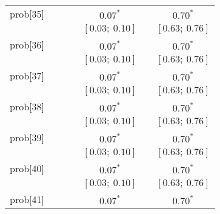 \begin{table}
\begin{center}
\begin{tabular}{l c c c c c c }
prob[35]  &                           &                           &                           & $0.07^{*}$              &                           & $0.70^{*}$            \\
          &                           &                           &                           & $[0.03;\ 0.10]$         &                           & $[0.63;\ 0.76]$       \\
prob[36]  &                           &                           &                           & $0.07^{*}$              &                           & $0.70^{*}$            \\
          &                           &                           &                           & $[0.03;\ 0.10]$         &                           & $[0.63;\ 0.76]$       \\
prob[37]  &                           &                           &                           & $0.07^{*}$              &                           & $0.70^{*}$            \\
          &                           &                           &                           & $[0.03;\ 0.10]$         &                           & $[0.63;\ 0.76]$       \\
prob[38]  &                           &                           &                           & $0.07^{*}$              &                           & $0.70^{*}$            \\
          &                           &                           &                           & $[0.03;\ 0.10]$         &                           & $[0.63;\ 0.76]$       \\
prob[39]  &                           &                           &                           & $0.07^{*}$              &                           & $0.70^{*}$            \\
          &                           &                           &                           & $[0.03;\ 0.10]$         &                           & $[0.63;\ 0.76]$       \\
prob[40]  &                           &                           &                           & $0.07^{*}$              &                           & $0.70^{*}$            \\
          &                           &                           &                           & $[0.03;\ 0.10]$         &                           & $[0.63;\ 0.76]$       \\
prob[41]  &                           &                           &                           & $0.07^{*}$              &                           & $0.70^{*}$            \\

\end{tabular}
\end{center}
\end{table}
